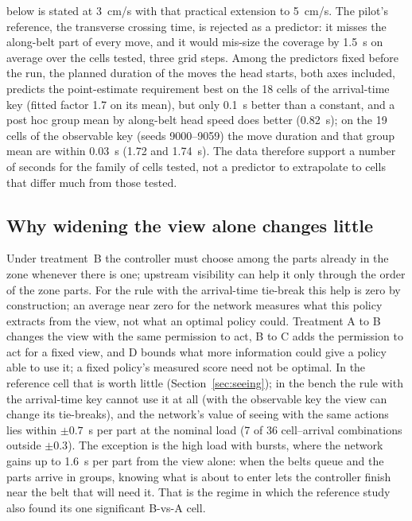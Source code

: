 \documentclass[11pt,a4paper]{article}
\begin{document}
below is stated at 3~cm/s with that practical extension to 5~cm/s. The pilot's reference, the transverse
crossing time, is rejected as a predictor: it misses the along-belt part of every move,
and it would mis-size the coverage by 1.5~s on average over the cells tested, three grid
steps. Among the predictors fixed before the run, the planned duration of the moves the
head starts, both axes included, predicts the point-estimate requirement best on the 18
cells of the arrival-time key (fitted factor 1.7 on its mean), but only 0.1~s better than
a constant, and a post hoc group mean by along-belt head speed does better (0.82~s); on the
19 cells of the observable key (seeds 9000--9059) the move duration and that group mean are within 0.03~s
(1.72 and 1.74~s). The data therefore support a number of seconds for the family of cells
tested, not a predictor to extrapolate to cells that differ much from those tested.

\subsection{Why widening the view alone changes little}
Under treatment~B the controller must choose among the parts already in the zone
whenever there is one; upstream visibility can help it only through the order of the
zone parts. For the rule with the arrival-time tie-break this help is zero by construction;
an average near zero for the network measures what this policy extracts from the view, not
what an optimal policy could. Treatment A to B changes the view with the same permission
to act, B to C adds the permission to act for a fixed view, and D bounds what more
information could give a policy able to use it; a fixed policy's measured score need not
be optimal. In the reference cell that is worth little (Section~\ref{sec:seeing}); in the
bench the rule with the arrival-time key cannot use it at all (with the observable key the
view can change its tie-breaks), and the network's value of seeing with the same
actions lies within $\pm0.7$~s per part at the nominal load (7 of 36 cell--arrival
combinations outside $\pm0.3$). The exception is the high load
with bursts, where the network gains up to 1.6~s per part from the view alone: when the
belts queue and the parts arrive in groups, knowing what is about to enter lets the
controller finish near the belt that will need it. That is the regime in which the
reference study also found its one significant B-vs-A cell.
\end{document}

